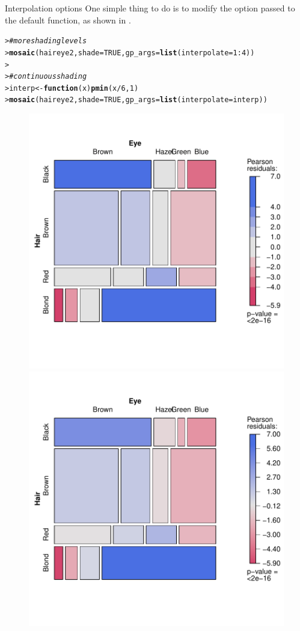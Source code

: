 \documentclass[10pt,krantz2]{krantz}\usepackage[]{graphicx}\usepackage[]{color}
\makeatletter
\newcommand{\hlnum}[1]{\textcolor[rgb]{0.686,0.059,0.569}{#1}}%
\newcommand{\hlcom}[1]{\textcolor[rgb]{0.678,0.584,0.686}{\textit{#1}}}%
\newcommand{\hlopt}[1]{\textcolor[rgb]{0,0,0}{#1}}%
\newcommand{\hlstd}[1]{\textcolor[rgb]{0.345,0.345,0.345}{#1}}%
\newcommand{\hlkwa}[1]{\textcolor[rgb]{0.161,0.373,0.58}{\textbf{#1}}}%
\newcommand{\hlkwb}[1]{\textcolor[rgb]{0.69,0.353,0.396}{#1}}%
\newcommand{\hlkwc}[1]{\textcolor[rgb]{0.333,0.667,0.333}{#1}}%
\newcommand{\hlkwd}[1]{\textcolor[rgb]{0.737,0.353,0.396}{\textbf{#1}}}%
\newenvironment{kframe}{%
 \def\at@end@of@kframe{}%
 \ifinner\ifhmode%
  \def\at@end@of@kframe{\end{minipage}}%
  \begin{minipage}{\columnwidth}%
 \fi\fi%
 \def\FrameCommand##1{\hskip\@totalleftmargin \hskip-\fboxsep
 \colorbox{shadecolor}{##1}\hskip-\fboxsep
     \hskip-\linewidth \hskip-\@totalleftmargin \hskip\columnwidth}%
 \MakeFramed {\advance\hsize-\width
   \@totalleftmargin\z@ \linewidth\hsize
   \@setminipage}}%
 {\par\unskip\endMakeFramed%
 \at@end@of@kframe}
\newenvironment{knitrout}{}{} %
\renewenvironment{knitrout}{\small\renewcommand{\baselinestretch}{.85}}{} %
\makeatother
\begin{document}
\begin{Example}[interp]{Interpolation options}
One simple thing to do is to modify the  option passed to the
default  function, as shown in .
\begin{knitrout}
\color{fgcolor}\begin{kframe}
\begin{alltt}
\hlstd{> }\hlcom{# more shading levels}
\hlstd{> }\hlkwd{mosaic}\hlstd{(haireye2,} \hlkwc{shade} \hlstd{=} \hlnum{TRUE}\hlstd{,} \hlkwc{gp_args} \hlstd{=} \hlkwd{list}\hlstd{(}\hlkwc{interpolate} \hlstd{=} \hlnum{1} \hlopt{:} \hlnum{4}\hlstd{))}
\hlstd{> }
\hlstd{> }\hlcom{# continuous shading}
\hlstd{> }\hlstd{interp} \hlkwb{<-} \hlkwa{function}\hlstd{(}\hlkwc{x}\hlstd{)} \hlkwd{pmin}\hlstd{(x} \hlopt{/} \hlnum{6}\hlstd{,} \hlnum{1}\hlstd{)}
\hlstd{> }\hlkwd{mosaic}\hlstd{(haireye2,} \hlkwc{shade} \hlstd{=} \hlnum{TRUE}\hlstd{,} \hlkwc{gp_args} \hlstd{=} \hlkwd{list}\hlstd{(}\hlkwc{interpolate} \hlstd{= interp))}
\end{alltt}
\end{kframe}\begin{figure}[!htbp]

\centerline{\includegraphics[width=.49\textwidth]{ch05/fig/HE-interp-1} 
\includegraphics[width=.49\textwidth]{ch05/fig/HE-interp-2} }


\end{figure}
\end{knitrout}
\end{Example}
\end{document}
